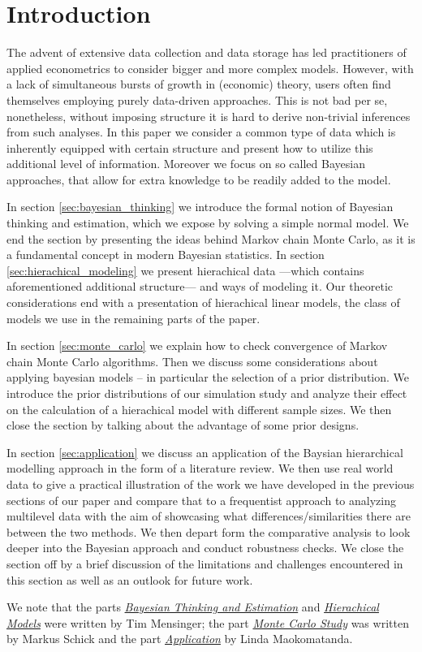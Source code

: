 \section{Introduction}

The advent of extensive data collection and data storage has led practitioners of applied econometrics to consider bigger and more complex models.
However, with a lack of simultaneous bursts of growth in (economic) theory, users often find themselves employing purely data-driven approaches.
This is not bad per se, nonetheless, without imposing structure it is hard to derive non-trivial inferences from such analyses.
In this paper we consider a common type of data which is inherently equipped with certain structure and present how to utilize this additional level of information.
Moreover we focus on so called Bayesian approaches, that allow for extra knowledge to be readily added to the model.

In section \ref{sec:bayesian_thinking} we introduce the formal notion of Bayesian thinking and estimation, which we expose by solving a simple normal model.
We end the section by presenting the ideas behind Markov chain Monte Carlo, as it is a fundamental concept in modern Bayesian statistics. In section \ref{sec:hierachical_modeling} we present hierachical data ---which contains aforementioned additional structure--- and ways of modeling it.
Our theoretic considerations end with a presentation of hierachical linear models, the class of models we use in the remaining parts of the paper.

In section \ref{sec:monte_carlo} we explain how to check convergence of Markov chain Monte Carlo algorithms. 
Then we discuss some considerations about applying bayesian models -- in particular the selection of a prior distribution. 
We introduce the prior distributions of our simulation study and analyze their effect on the calculation of a hierachical model with different sample sizes. 
We then close the section by talking about the advantage of some prior designs. 


In section \ref{sec:application} we discuss an application of the Baysian hierarchical modelling approach in the form of a literature review. We then use real world data to give a practical illustration of the work we have developed in the previous sections of our paper and compare that to a frequentist approach to analyzing multilevel data with the aim of showcasing what differences/similarities there are between the two methods. We then depart form the comparative analysis to look deeper into the Bayesian approach and conduct robustness checks. We close the section off by a brief discussion of the limitations and challenges encountered in this section as well as an outlook for future work.

We note that the parts \hyperref[sec:bayesian_thinking]{\emph{Bayesian Thinking and Estimation}} and \hyperref[sec:hierachical_modeling]{\emph{Hierachical Models}} were written by Tim Mensinger; the part \hyperref[sec:monte_carlo]{\emph{Monte Carlo Study}} was written by Markus Schick and the part \hyperref[sec:application]{\emph{Application}} by Linda Maokomatanda.
